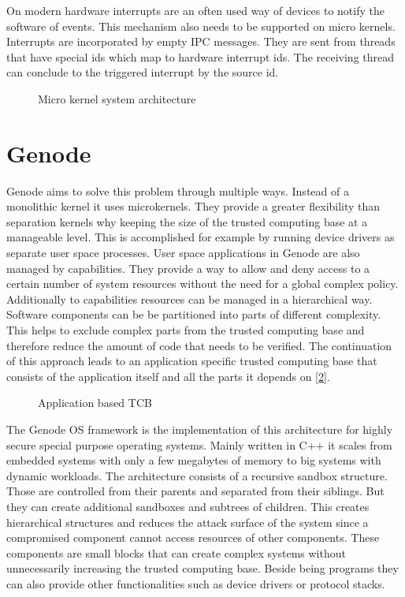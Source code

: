 \documentclass[
a4paper,
12pt,
notitlepage,
parskip=half,
DIV=11,
]{scrbook}
\begin{document}
		On modern hardware interrupts are an often used way of devices to notify the software of events.
		This mechanism also needs to be supported on micro kernels.
		Interrupts are incorporated by empty IPC messages.
		They are sent from threads that have special ids which map to hardware interrupt ids.
		The receiving thread can conclude to the triggered interrupt by the source id. \citep{Liedtke_1995}
		
		\begin{figure}
			\centering
			\def\svgwidth{\textwidth}
			
			\caption{Micro kernel system architecture}
			\label{microkernel}    
		\end{figure}
		
		\section{Genode}
		
		Genode aims to solve this problem through multiple ways.
		Instead of a monolithic kernel it uses microkernels.
		They provide a greater flexibility than separation kernels why keeping the size of the trusted computing base at a manageable level.
		This is accomplished for example by running device drivers as separate user space processes.
		User space applications in Genode are also managed by capabilities.
		They provide a way to allow and deny access to a certain number of system resources without the need for a global complex policy.
		Additionally to capabilities resources can be managed in a hierarchical way.
		Software components can be be partitioned into parts of different complexity.
		This helps to exclude complex parts from the trusted computing base and therefore reduce the amount of code that needs to be verified.
		The continuation of this approach leads to an application specific trusted computing base that consists of the application itself and all the parts it depends on [\ref{fig:tcb_tree}].
		\citep{genode}
		
		\begin{figure}
			\centering
			
			\caption{Application based TCB \citep{genode}}
			\label{fig:tcb_tree}
		\end{figure}
		
		The Genode OS framework is the implementation of this architecture for highly secure special purpose operating systems.
		Mainly written in C++ it scales from embedded systems with only a few megabytes of memory to big systems with dynamic workloads.
		The architecture consists of a recursive sandbox structure.
		Those are controlled from their parents and separated from their siblings.
		But they can create additional sandboxes and subtrees of children.
		This creates hierarchical structures and reduces the attack surface of the system since a compromised component cannot access resources of other components.
		These components are small blocks that can create complex systems without unnecessarily increasing the trusted computing base.
		Beside being programs they can also provide other functionalities such as device drivers or protocol stacks.
		
\end{document}
